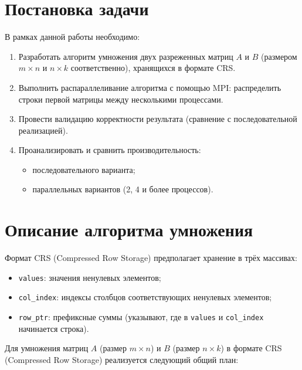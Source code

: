 \documentclass[12pt]{article}
\begin{document}
\section{Постановка задачи}
В рамках данной работы необходимо:
\begin{enumerate}
    \item Разработать алгоритм умножения двух разреженных матриц $A$ и $B$ (размером $m\times n$ и $n\times k$ соответственно), хранящихся в формате CRS.
    \item Выполнить распараллеливание алгоритма с помощью MPI: распределить строки первой матрицы между несколькими процессами.
    \item Провести валидацию корректности результата (сравнение с последовательной реализацией).
    \item Проанализировать и сравнить производительность:
        \begin{itemize}
            \item последовательного варианта;
            \item параллельных вариантов (2, 4 и более процессов).
        \end{itemize}
\end{enumerate}

\section{Описание алгоритма умножения}

Формат CRS (Compressed Row Storage) предполагает хранение в трёх массивах:
\begin{itemize}
    \item \texttt{values}: значения ненулевых элементов;
    \item \texttt{col\_index}: индексы столбцов соответствующих ненулевых элементов;
    \item \texttt{row\_ptr}: префиксные суммы (указывают, где в \texttt{values} и \texttt{col\_index} начинается строка).
\end{itemize}

Для умножения матриц \(A\) (размер \(m \times n\)) и \(B\) (размер \(n \times k\)) в формате CRS (Compressed Row Storage) реализуется следующий общий план:
\end{document}
